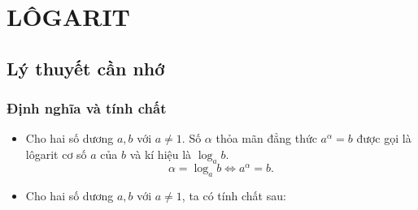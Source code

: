 \setcounter{dang}{0}
\section{LÔGARIT}
\subsection{Lý thuyết cần nhớ}
\subsubsection{Định nghĩa và tính chất}
	\begin{itemize}
			\item [\iconMT] Cho hai số dương $a, b$ với $a\neq 1$. Số $\alpha$ thỏa mãn đẳng thức $a^{\alpha}=b$ được gọi là lôgarit cơ số $a$ của $b$ và kí hiệu là $\log_ab$.
			$$\alpha=\log_ab \Leftrightarrow a^{\alpha}=b.$$
			\item [\iconMT] Cho hai số dương $a, b$ với $a\neq 1$, ta có tính chất sau:
			\begin{boxdn}
		\end{boxdn}	
	\end{itemize}

